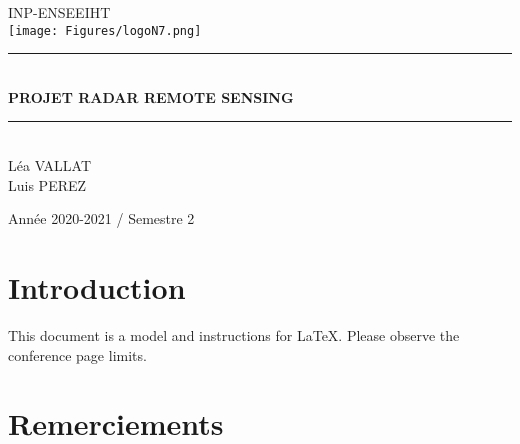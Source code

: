 \documentclass{article}
\newcommand{\HRule}{\rule{\linewidth}{0.5mm}}
\begin{document}
\begin{titlepage}
  \begin{sffamily}
  \begin{center}


    \textsc{\LARGE INP-ENSEEIHT}\\[2cm]

    
    \texttt{[image: Figures/logoN7.png]}
    \\
    
    \HRule \\[0.4cm]
        { \huge \bfseries PROJET RADAR REMOTE SENSING\\[0.4cm] }

    \HRule \\[2cm]

        Léa VALLAT\\
        Luis PEREZ\\
    
    \vfill

    {\large Année 2020-2021 / Semestre 2}

  \end{center}
  \end{sffamily}
\end{titlepage}

\newpage

\section{Introduction}
This document is a model and instructions for \LaTeX.
Please observe the conference page limits. 


\tableofcontents

\newpage
\section{Remerciements}
\end{document}

